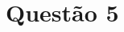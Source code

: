 \documentclass[brazilian, 12pt, a4paper, final]{article}
\begin{document}




	



\section*{Questão 5}
\end{document}
